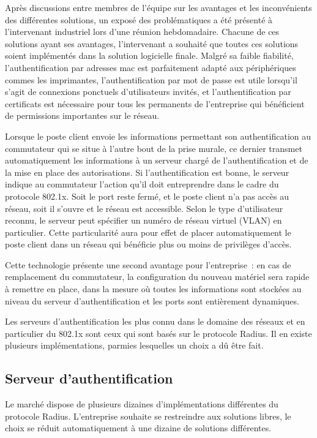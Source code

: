 Après discussions entre membres de l'équipe sur les avantages et les inconvénients des différentes solutions, un exposé des problématiques a été présenté à l'intervenant industriel lors d'une réunion hebdomadaire. Chacune de ces solutions ayant ses avantages, l'intervenant a souhaité que toutes ces solutions soient implémentés dans la solution logicielle finale. Malgré sa faible fiabilité, l'authentification par adresses mac est parfaitement adapté aux périphériques commes les imprimantes, l'authentification par mot de passe est utile lorsqu'il s'agit de connexions ponctuels d'utilisateurs invités, et l'authentification par certificats est nécessaire pour tous les permanents de l'entreprise qui bénéficient de permissions importantes sur le réseau.

Lorsque le poste client envoie les informations permettant son authentification au commutateur qui se situe à l'autre bout de la prise murale, ce dernier transmet automatiquement les informations à un serveur chargé de l'authentification et de la mise en place des autorisations. Si l'authentification est bonne, le serveur indique au commutateur l'action qu'il doit entreprendre dans le cadre du protocole 802.1x. Soit le port reste fermé, et le poste client n'a pas accès au réseau, soit il s'ouvre et le réseau est accessible. Selon le type d'utilisateur reconnu, le serveur peut spécifier un numéro de réseau virtuel (VLAN) en particulier. Cette particularité aura pour effet de placer automatiquement le poste client dans un réseau qui bénéficie plus ou moins de privilèges d'accès.

Cette technologie présente une second avantage pour l'entreprise~: en cas de remplacement du commutateur, la configuration du nouveau matériel sera rapide à remettre en place, dans la mesure où toutes les informations sont stockées au niveau du serveur d'authentification et les ports sont entièrement dynamiques.

Les serveurs d'authentification les plus connu dans le domaine des réseaux et en particulier du 802.1x sont ceux qui sont basés sur le protocole Radius. Il en existe plusieurs implémentations, parmies lesquelles un choix a dû être fait.

\subsection{Serveur d'authentification}

Le marché dispose de plusieurs dizaines d'implémentations différentes du protocole Radius. L'entreprise souhaite se restreindre aux solutions libres, le choix se réduit automatiquement à une dizaine de solutions différentes.

